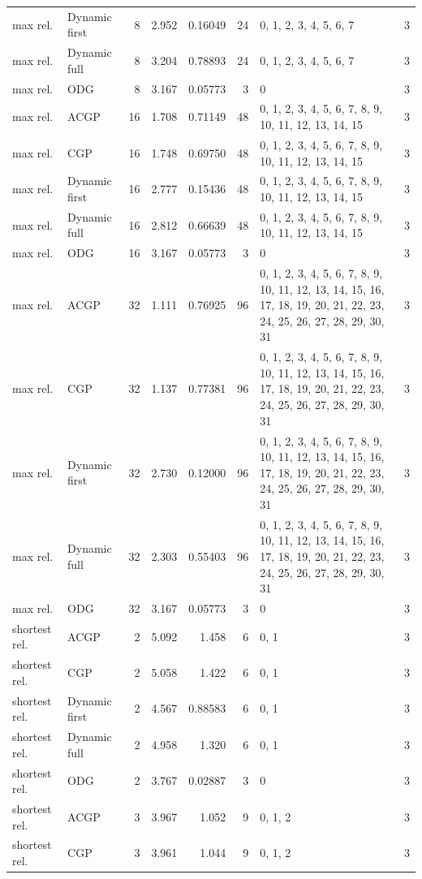 \documentclass[10pt,a4paper]{article}
\begin{document}
\begin{longtable}{@{}p{23mm}p{29mm}rrrrp{36mm}r@{}}
max rel. & Dynamic first & 8 & 2.952 & 0.16049 & 24 & 0, 1, 2, 3, 4, 5, 6, 7 & 3 \\
max rel. & Dynamic full & 8 & 3.204 & 0.78893 & 24 & 0, 1, 2, 3, 4, 5, 6, 7 & 3 \\
max rel. & ODG & 8 & 3.167 & 0.05773 & 3 & 0 & 3 \\
max rel. & ACGP & 16 & 1.708 & 0.71149 & 48 & 0, 1, 2, 3, 4, 5, 6, 7, 8, 9, 10, 11, 12, 13, 14, 15 & 3 \\
max rel. & CGP & 16 & 1.748 & 0.69750 & 48 & 0, 1, 2, 3, 4, 5, 6, 7, 8, 9, 10, 11, 12, 13, 14, 15 & 3 \\
max rel. & Dynamic first & 16 & 2.777 & 0.15436 & 48 & 0, 1, 2, 3, 4, 5, 6, 7, 8, 9, 10, 11, 12, 13, 14, 15 & 3 \\
max rel. & Dynamic full & 16 & 2.812 & 0.66639 & 48 & 0, 1, 2, 3, 4, 5, 6, 7, 8, 9, 10, 11, 12, 13, 14, 15 & 3 \\
max rel. & ODG & 16 & 3.167 & 0.05773 & 3 & 0 & 3 \\
max rel. & ACGP & 32 & 1.111 & 0.76925 & 96 & 0, 1, 2, 3, 4, 5, 6, 7, 8, 9, 10, 11, 12, 13, 14, 15, 16, 17, 18, 19, 20, 21, 22, 23, 24, 25, 26, 27, 28, 29, 30, 31 & 3 \\
max rel. & CGP & 32 & 1.137 & 0.77381 & 96 & 0, 1, 2, 3, 4, 5, 6, 7, 8, 9, 10, 11, 12, 13, 14, 15, 16, 17, 18, 19, 20, 21, 22, 23, 24, 25, 26, 27, 28, 29, 30, 31 & 3 \\
max rel. & Dynamic first & 32 & 2.730 & 0.12000 & 96 & 0, 1, 2, 3, 4, 5, 6, 7, 8, 9, 10, 11, 12, 13, 14, 15, 16, 17, 18, 19, 20, 21, 22, 23, 24, 25, 26, 27, 28, 29, 30, 31 & 3 \\
max rel. & Dynamic full & 32 & 2.303 & 0.55403 & 96 & 0, 1, 2, 3, 4, 5, 6, 7, 8, 9, 10, 11, 12, 13, 14, 15, 16, 17, 18, 19, 20, 21, 22, 23, 24, 25, 26, 27, 28, 29, 30, 31 & 3 \\
max rel. & ODG & 32 & 3.167 & 0.05773 & 3 & 0 & 3 \\
shortest rel. & ACGP & 2 & 5.092 & 1.458 & 6 & 0, 1 & 3 \\
shortest rel. & CGP & 2 & 5.058 & 1.422 & 6 & 0, 1 & 3 \\
shortest rel. & Dynamic first & 2 & 4.567 & 0.88583 & 6 & 0, 1 & 3 \\
shortest rel. & Dynamic full & 2 & 4.958 & 1.320 & 6 & 0, 1 & 3 \\
shortest rel. & ODG & 2 & 3.767 & 0.02887 & 3 & 0 & 3 \\
shortest rel. & ACGP & 3 & 3.967 & 1.052 & 9 & 0, 1, 2 & 3 \\
shortest rel. & CGP & 3 & 3.961 & 1.044 & 9 & 0, 1, 2 & 3 \\

\end{longtable}
\end{document}

